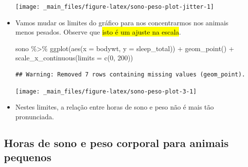 \documentclass[
  11pt]{report}
\newenvironment{Shaded}{\begin{snugshade}}{\end{snugshade}}
\newcommand{\AttributeTok}[1]{\textcolor[rgb]{0.77,0.63,0.00}{#1}}
\newcommand{\DecValTok}[1]{\textcolor[rgb]{0.00,0.00,0.81}{#1}}
\newcommand{\FunctionTok}[1]{\textcolor[rgb]{0.00,0.00,0.00}{#1}}
\newcommand{\NormalTok}[1]{#1}
\newcommand{\SpecialCharTok}[1]{\textcolor[rgb]{0.00,0.00,0.00}{#1}}
\renewenvironment{Shaded}{
    \begin{mdframed}[%
      roundcorner=2pt,%
      innerleftmargin=5pt,%
      innerrightmargin=5pt,%
      topline=true,%
      leftline=true,%
      rightline=true,%
      bottomline=true,%
      linewidth=0.5pt,%
      linecolor=black!20,%
      backgroundcolor=black!2,%
      skipabove=2ex,%
      skipbelow=2.5ex%
    ]%
  }
  {
    \end{mdframed}
  }
\begin{document}
\begin{itemize}
  \begin{center}\texttt{[image: \_main\_files/figure-latex/sono-peso-plot-jitter-1]} \end{center}
\item
  Vamos mudar os limites do gráfico para nos concentrarmos nos animais menos pesados. Observe que {\hl{isto é um ajuste na escala}}.

\begin{Shaded}
\begin{Highlighting}[]
\NormalTok{sono }\SpecialCharTok{\%\textgreater{}\%} 
  \FunctionTok{ggplot}\NormalTok{(}\FunctionTok{aes}\NormalTok{(}\AttributeTok{x =}\NormalTok{ bodywt, }\AttributeTok{y =}\NormalTok{ sleep\_total)) }\SpecialCharTok{+}
    \FunctionTok{geom\_point}\NormalTok{() }\SpecialCharTok{+}
    \FunctionTok{scale\_x\_continuous}\NormalTok{(}\AttributeTok{limits =} \FunctionTok{c}\NormalTok{(}\DecValTok{0}\NormalTok{, }\DecValTok{200}\NormalTok{))}
\end{Highlighting}
\end{Shaded}

\begin{verbatim}
## Warning: Removed 7 rows containing missing values (geom_point).
\end{verbatim}

  \begin{center}\texttt{[image: \_main\_files/figure-latex/sono-peso-plot-3-1]} \end{center}
\item
  Nestes limites, a relação entre horas de sono e peso não é mais tão pronunciada.
\end{itemize}

\hypertarget{horas-de-sono-e-peso-corporal-para-animais-pequenos}{%
\subsection{Horas de sono e peso corporal para animais pequenos}\label{horas-de-sono-e-peso-corporal-para-animais-pequenos}}
\end{document}
